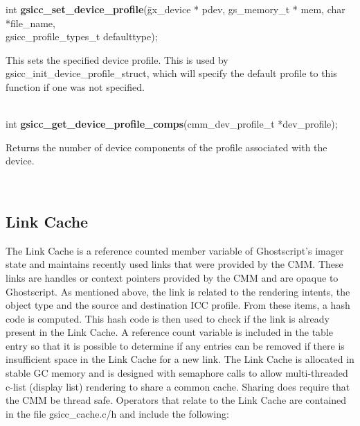 \documentclass[12pt,notitlepage]{article}
\begin{document}
\begin{tabbing}
\noindent int {\bf gsicc\_set\_device\_profile}(\=gx\_device * pdev, gs\_memory\_t * mem,
                             char *file\_name,\\
                             \>gsicc\_profile\_types\_t defaulttype);\\
\end{tabbing}


\begin{minipage}[h]{6.0in}
This sets the specified device profile.  This is used by gsicc\_init\_device\_profile\_struct, which
will specify the default profile to this function if one was not specified.
\end{minipage}\\

\noindent int  {\bf gsicc\_get\_device\_profile\_comps}(cmm\_dev\_profile\_t *dev\_profile);\\

\begin{minipage}[h]{6.0in}
Returns the number of device components of the profile associated with the device.
\end{minipage}\\

\singlespace

\subsection{Link Cache}

The Link Cache is a reference counted member variable of Ghostscript's imager state and maintains recently used links that were provided by the CMM.  These links are handles or context pointers provided by the CMM and are opaque to Ghostscript.  As mentioned above, the link is related to the rendering intents, the object type and the source and destination ICC profile.  From these items, a hash code is computed.  This hash code is then used to check if the link is already present in the Link Cache.  A reference count variable is included in the table entry so that it is possible to determine if any entries can be removed if there is insufficient space in the Link Cache for a new link.
The Link Cache is allocated in stable GC memory and is designed with semaphore calls to allow multi-threaded c-list (display list) rendering to share a common cache.   Sharing does require that the CMM be thread safe.
Operators that relate to the Link Cache are contained in the file gsicc\_cache.c/h and include the following:\\
\end{document}
